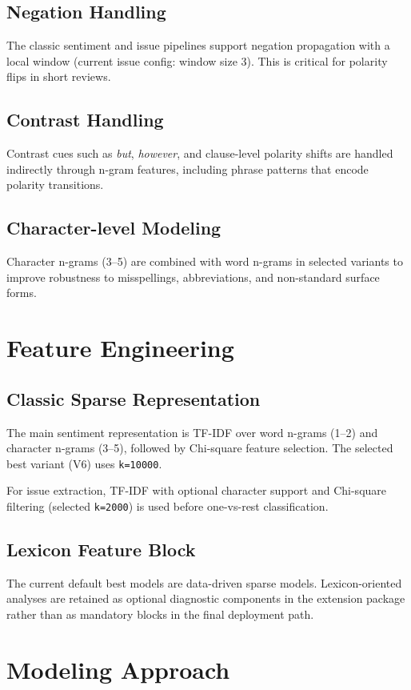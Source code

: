 \documentclass[12pt,a4paper]{article}
\begin{document}
\subsection{Negation Handling}
The classic sentiment and issue pipelines support negation propagation with a local window (current issue config: window size 3). This is critical for polarity flips in short reviews.

\subsection{Contrast Handling}
Contrast cues such as \textit{but}, \textit{however}, and clause-level polarity shifts are handled indirectly through n-gram features, including phrase patterns that encode polarity transitions.

\subsection{Character-level Modeling}
Character n-grams (3--5) are combined with word n-grams in selected variants to improve robustness to misspellings, abbreviations, and non-standard surface forms.

\section{Feature Engineering}
\subsection{Classic Sparse Representation}
The main sentiment representation is TF-IDF over word n-grams (1--2) and character n-grams (3--5), followed by Chi-square feature selection. The selected best variant (V6) uses \texttt{k=10000}.

For issue extraction, TF-IDF with optional character support and Chi-square filtering (selected \texttt{k=2000}) is used before one-vs-rest classification.

\subsection{Lexicon Feature Block}
The current default best models are data-driven sparse models. Lexicon-oriented analyses are retained as optional diagnostic components in the extension package rather than as mandatory blocks in the final deployment path.

\section{Modeling Approach}
\end{document}
